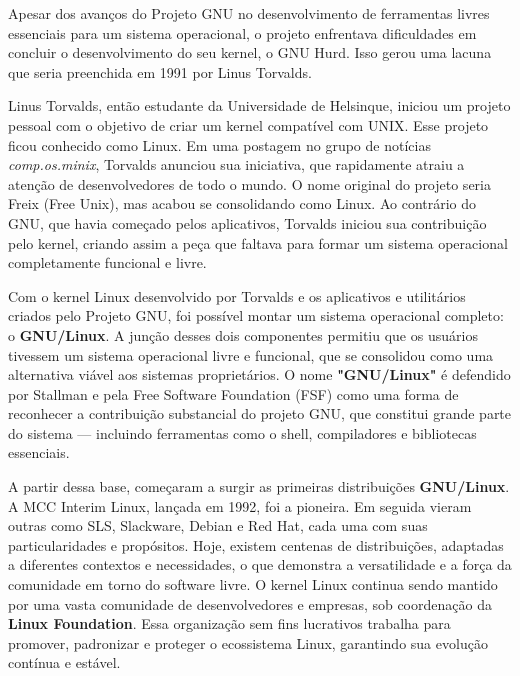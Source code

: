 \documentclass[12pt,oneside,a4paper]{abntex2}
\begin{document}
Apesar dos avanços do Projeto GNU no desenvolvimento de ferramentas livres essenciais para um sistema operacional, o projeto enfrentava dificuldades em concluir o desenvolvimento do seu kernel, o GNU Hurd. Isso gerou uma lacuna que seria preenchida em 1991 por Linus Torvalds.

Linus Torvalds, então estudante da Universidade de Helsinque, iniciou um projeto pessoal com o objetivo de criar um kernel compatível com UNIX. Esse projeto ficou conhecido como Linux. Em uma postagem no grupo de notícias \textit{comp.os.minix}, Torvalds anunciou sua iniciativa, que rapidamente atraiu a atenção de desenvolvedores de todo o mundo. O nome original do projeto seria Freix (Free Unix), mas acabou se consolidando como Linux. Ao contrário do GNU, que havia começado pelos aplicativos, Torvalds iniciou sua contribuição pelo kernel, criando assim a peça que faltava para formar um sistema operacional completamente funcional e livre.

Com o kernel Linux desenvolvido por Torvalds e os aplicativos e utilitários criados pelo Projeto GNU, foi possível montar um sistema operacional completo: o \textbf{GNU/Linux}. A junção desses dois componentes permitiu que os usuários tivessem um sistema operacional livre e funcional, que se consolidou como uma alternativa viável aos sistemas proprietários. O nome \textbf{"GNU/Linux"} é defendido por Stallman e pela Free Software Foundation (FSF) como uma forma de reconhecer a contribuição substancial do projeto GNU, que constitui grande parte do sistema — incluindo ferramentas como o shell, compiladores e bibliotecas essenciais.

A partir dessa base, começaram a surgir as primeiras distribuições \textbf{GNU/Linux}. A MCC Interim Linux, lançada em 1992, foi a pioneira. Em seguida vieram outras como SLS, Slackware, Debian e Red Hat, cada uma com suas particularidades e propósitos. Hoje, existem centenas de distribuições, adaptadas a diferentes contextos e necessidades, o que demonstra a versatilidade e a força da comunidade em torno do software livre. O kernel Linux continua sendo mantido por uma vasta comunidade de desenvolvedores e empresas, sob coordenação da \textbf{Linux Foundation}. Essa organização sem fins lucrativos trabalha para promover, padronizar e proteger o ecossistema Linux, garantindo sua evolução contínua e estável.
\end{document}
